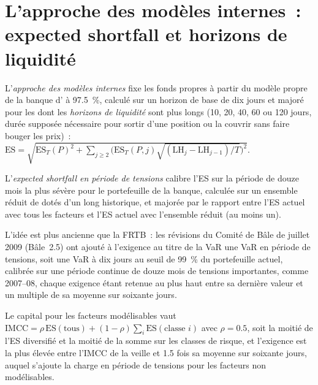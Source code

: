 \section{L'approche des modèles internes~: expected shortfall et horizons de liquidité}

\begin{definition}\label{def:rc:regulatory-capital-for-trading-books:ima}
L'\emph{approche des modèles internes} fixe les fonds propres à partir du
modèle propre de la banque d' à 97.5~\%, calculé sur un horizon de base de dix jours et majoré
pour les  dont les \emph{horizons de liquidité} sont plus longs (10, 20, 40,
60 ou 120 jours, durée supposée nécessaire pour sortir d'une position ou la couvrir sans faire bouger les prix)~:
$\mathrm{ES} = \sqrt{\mathrm{ES}_T(P)^2+\sum_{j\ge2}\bigl(\mathrm{ES}_T(P,j)\sqrt{(\mathrm{LH}_j-\mathrm{LH}_{j-1})/T}\bigr)^2}$.
\end{definition}

\begin{definition}\label{def:rc:regulatory-capital-for-trading-books:ses}
L'\emph{expected shortfall en période de tensions} calibre l'ES sur la
période de douze mois la plus sévère pour le portefeuille de la banque, calculée sur un ensemble réduit de 
dotés d'un long historique, et majorée par le rapport entre l'ES actuel avec tous les facteurs et
l'ES actuel avec l'ensemble réduit (au moins un).
\end{definition}

L'idée est plus ancienne que la FRTB~: les révisions du Comité de Bâle de juillet 2009 (Bâle~2.5) ont ajouté à l'exigence au titre de la VaR
une VaR en période de tensions, soit une VaR à dix jours au seuil de 99~\% du portefeuille actuel, calibrée sur une période continue
de douze mois de tensions importantes, comme 2007--08, chaque exigence étant retenue au plus haut entre sa dernière valeur et un
multiple de sa moyenne sur soixante jours.

Le capital pour les facteurs modélisables vaut $\mathrm{IMCC} = \rho\,\mathrm{ES}(\text{tous})+(1-\rho)\sum_i\mathrm{ES}(\text{classe }i)$ avec $\rho = 0.5$,
soit la moitié de l'ES diversifié et la moitié de la somme sur les classes de risque, et l'exigence est la plus élevée entre
l'IMCC de la veille et 1.5 fois sa moyenne sur soixante jours, auquel s'ajoute la charge en période de tensions pour les
facteurs non modélisables.

